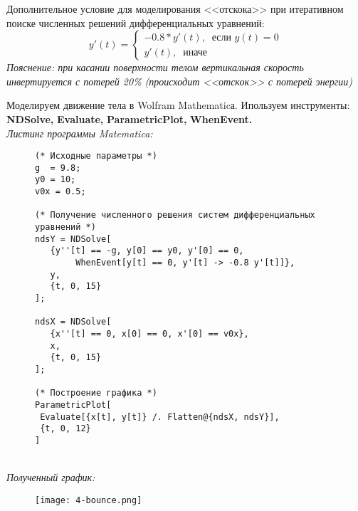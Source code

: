 Дополнительное условие для моделирования <<отскока>>
при итеративном поиске численных решений дифференциальных уравнений:
\begin{equation*}
    y'(t) = 
    \left\{
        \begin{gathered}
            -0.8*y'(t), \;\; \text{если } y(t) = 0\\
            y'(t), \;\; \text{иначе} 
        \end{gathered}
    \right. 
\end{equation*}
\textit{Пояснение: при касании поверхности телом вертикальная скорость инвертируется с потерей 20\% (происходит <<отскок>> с потерей энергии)}

\newpage
Моделируем движение тела в Wolfram Mathematicа. 
Ипользуем инструменты: 
\textbf{NDSolve,} %
\textbf{Evaluate,} %
\textbf{ParametricPlot,} %
\textbf{WhenEvent.}\\[10pt]

\textit{Листинг программы Matematica:}
\begin{figure}[ht]
    \begin{lstlisting}
(* Исходные параметры *)
g  = 9.8;
y0 = 10;
v0x = 0.5;

(* Получение численного решения систем дифференциальных уравнений *)
ndsY = NDSolve[
   {y''[t] == -g, y[0] == y0, y'[0] == 0, 
        WhenEvent[y[t] == 0, y'[t] -> -0.8 y'[t]]},
   y,
   {t, 0, 15}
];

ndsX = NDSolve[
   {x''[t] == 0, x[0] == 0, x'[0] == v0x},
   x,
   {t, 0, 15}
];

(* Построение графика *)
ParametricPlot[
 Evaluate[{x[t], y[t]} /. Flatten@{ndsX, ndsY}], 
 {t, 0, 12}
]
    \end{lstlisting} 
\end{figure}\\[0pt]
\textit{Полученный график:}
\begin{figure}[ht]
\centering
\texttt{[image: 4-bounce.png]}
\end{figure}
